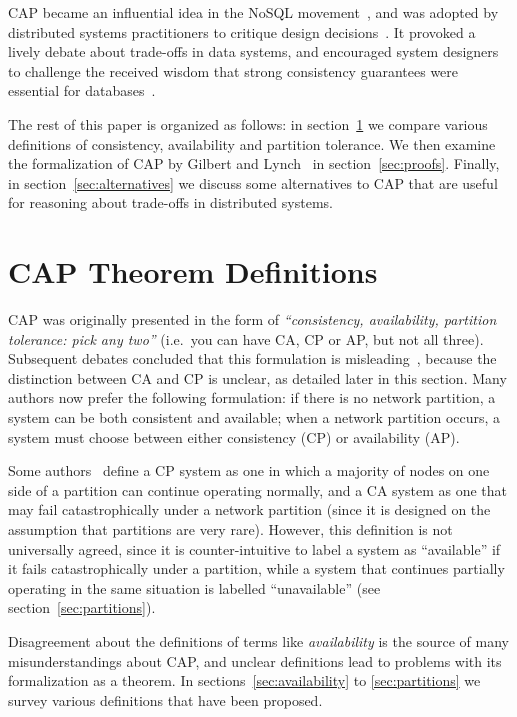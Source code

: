 \documentclass[a4paper,twocolumn,10pt]{article}
\begin{document}
CAP became an influential idea in the NoSQL movement~\cite{Vogels2008ey}, and was adopted by
distributed systems practitioners to critique design decisions~\cite{Hodges2013tj}. It provoked a
lively debate about trade-offs in data systems, and encouraged system designers to challenge the
received wisdom that strong consistency guarantees were essential for databases~\cite{Brewer2012ba}.

The rest of this paper is organized as follows: in section~\ref{sec:definitions} we compare various
definitions of consistency, availability and partition tolerance. We then examine the formalization
of CAP by Gilbert and Lynch~\cite{Gilbert2002il} in section~\ref{sec:proofs}. Finally, in
section~\ref{sec:alternatives} we discuss some alternatives to CAP that are useful for reasoning
about trade-offs in distributed systems.

\section{CAP Theorem Definitions}\label{sec:definitions}

CAP was originally presented in the form of \emph{``consistency, availability, partition tolerance:
pick any two''} (i.e.\ you can have CA, CP or AP, but not all three). Subsequent debates concluded
that this formulation is misleading~\cite{Brewer2012ba, Hale2010we, Robinson2010tp}, because the
distinction between CA and CP is unclear, as detailed later in this section. Many authors now prefer
the following formulation: if there is no network partition, a system can be both consistent and
available; when a network partition occurs, a system must choose between either consistency (CP) or
availability (AP).

Some authors~\cite{Darcy2010ta, Liochon2015vt} define a CP system as one in which a majority of
nodes on one side of a partition can continue operating normally, and a CA system as one that may
fail catastrophically under a network partition (since it is designed on the assumption that
partitions are very rare). However, this definition is not universally agreed, since it is
counter-intuitive to label a system as ``available'' if it fails catastrophically under a partition,
while a system that continues partially operating in the same situation is labelled ``unavailable''
(see section~\ref{sec:partitions}).

Disagreement about the definitions of terms like \emph{availability} is the source of many
misunderstandings about CAP, and unclear definitions lead to problems with its formalization as a
theorem. In sections~\ref{sec:availability} to \ref{sec:partitions} we survey various definitions
that have been proposed.
\end{document}
